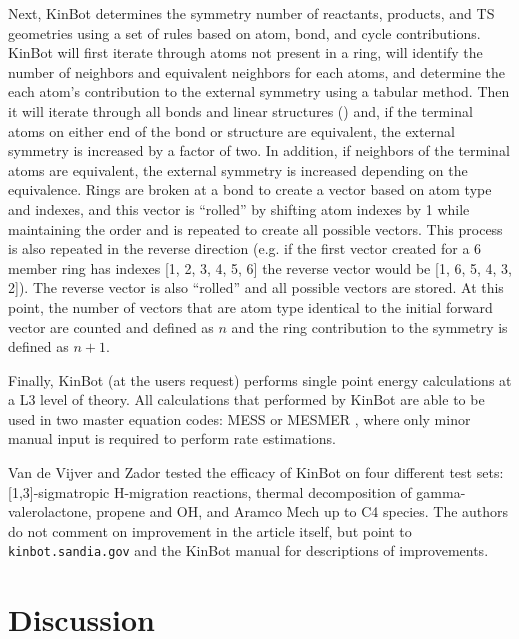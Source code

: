 \documentclass[preprint, 11pt]{elsarticle} %
\begin{document}
Next, KinBot determines the symmetry number of reactants, products, and TS geometries using a set of rules based on atom, bond, and cycle contributions.
KinBot will first iterate through atoms not present in a ring, will identify the number of neighbors and equivalent neighbors for each atoms, and determine the each atom's contribution to the external symmetry using a tabular method.
Then it will iterate through all bonds and linear structures () and, if the terminal atoms on either end of the bond or structure are equivalent, the external symmetry is increased by a factor of two.
In addition, if neighbors of the terminal atoms are equivalent, the external symmetry is increased depending on the equivalence.
Rings are broken at a bond to create a vector based on atom type and indexes, and this vector is ``rolled'' by shifting atom indexes by 1 while maintaining the order and is repeated to create all possible vectors.
This process is also repeated in the reverse direction (e.g. if the first vector created for a 6 member ring has indexes [1, 2, 3, 4, 5, 6] the reverse vector would be [1, 6, 5, 4, 3, 2]).
The reverse vector is also ``rolled'' and all possible vectors are stored.
At this point, the number of vectors that are atom type identical to the initial forward vector are counted and defined as $n$ and the ring contribution to the symmetry is defined as $n+1$. 

Finally, KinBot (at the users request) performs single point energy calculations at a L3 level of theory.
All calculations that performed by KinBot are able to be used in two master equation codes: MESS \cite{MESS:2013} or MESMER \cite{MESMER:2012}, where only minor manual input is required to perform rate estimations.

Van de Vijver and Zador tested the efficacy of KinBot on four different test sets: [1,3]-sigmatropic H-migration reactions, thermal decomposition of gamma-valerolactone, propene and OH, and Aramco Mech up to C4 species.
The authors do not comment on improvement in the article itself, but point to \texttt{kinbot.sandia.gov} and the KinBot manual for descriptions of improvements.



\section{Discussion}
%
\end{document}
